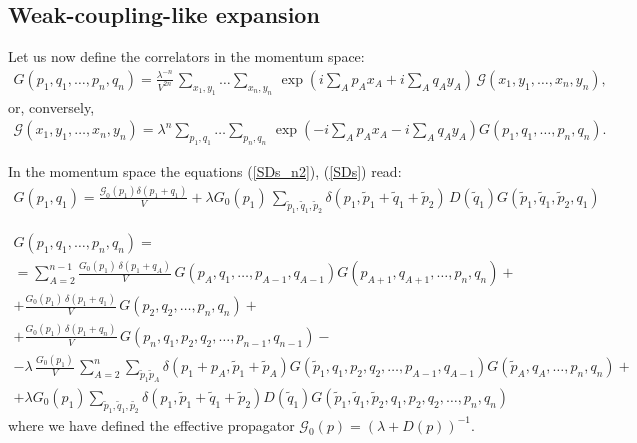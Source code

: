 \documentclass[12pt]{article}
\newcommand{\lr}[1]{ \left( #1 \right) }
\newcommand{\expa}[1]{ \exp{\left( #1 \right)} }
\newcommand{\G}{\mathcal{G}}
\begin{document}
\subsection*{Weak-coupling-like expansion}

Let us now define the correlators in the momentum space:
\begin{eqnarray}
\label{momentum_space_def}
 G\lr{p_1, q_1, \ldots, p_n, q_n} = \frac{\lambda^{-n}}{V^{2 n}} \,
\sum\limits_{x_1, y_1} \ldots \sum\limits_{x_n, y_n} \,
\expa{i \sum\limits_A p_A x_A + i \sum\limits_A q_A y_A} \,
\G\lr{x_1, y_1, \ldots, x_n, y_n}  ,
\end{eqnarray}
or, conversely,
\begin{eqnarray}
\label{momentum_space_def_inverse}
 \G\lr{x_1, y_1, \ldots, x_n, y_n}
 =
 \lambda^{n}
 \sum\limits_{p_1, q_1} \ldots \sum\limits_{p_n, q_n} \,
 \expa{-i \sum\limits_A p_A x_A - i \sum\limits_A q_A y_A}
  G\lr{p_1, q_1, \ldots, p_n, q_n} .
\end{eqnarray}

In the momentum space the equations (\ref{SDs_n2}), (\ref{SDs}) read:
\begin{eqnarray}
\label{SDs_n2_momentum}
 G\lr{p_1, q_1} = \frac{\G_0\lr{p_1} \delta\lr{p_1 + q_1}}{V}
 +
 \lambda G_0\lr{p_1} \,
\sum\limits_{\tilde{p}_1, \tilde{q}_1, \tilde{p}_2}
\delta\lr{p_1, \tilde{p}_1 + \tilde{q}_1 + \tilde{p}_2} \,
D\lr{\tilde{q}_1} G\lr{\tilde{p}_1, \tilde{q}_1, \tilde{p}_2, q_1}
\end{eqnarray}

\begin{eqnarray}
\label{SDs_pcm_momentum}
 G\lr{p_1, q_1, \ldots, p_n, q_n}
 = \nonumber \\ =
 \sum\limits_{A=2}^{n-1}
 \frac{G_0\lr{p_1} \, \delta\lr{p_1 + q_A}}{V} \,
 G\lr{    p_A,     q_1, \ldots, p_{A-1}, q_{A-1}}
 G\lr{p_{A+1}, q_{A+1}, \ldots,     p_n,    q_n }
 + \nonumber \\ +
 \frac{G_0\lr{p_1} \, \delta\lr{p_1 + q_1}}{V} \,
 G\lr{p_2, q_2, \ldots, p_n, q_n}
 + \nonumber \\ +
 \frac{G_0\lr{p_1} \, \delta\lr{p_1 + q_n}}{V} \,
 G\lr{p_n, q_1, p_2, q_2, \ldots, p_{n-1}, q_{n-1}}
 - \nonumber \\ -
 \lambda \, \frac{G_0\lr{p_1}}{V} \,
 \sum\limits_{A=2}^{n}
 \sum\limits_{\tilde{p}_1 \tilde{p}_A} \delta\lr{p_1 + p_A, \tilde{p}_1 + \tilde{p}_A}
 G\lr{\tilde{p}_1, q_1, p_2, q_2, \ldots, p_{A-1}, q_{A-1}}
 G\lr{\tilde{p}_A, q_A,           \ldots, p_n, q_n}
 + \nonumber \\ +
 \lambda G_0\lr{p_1}
 \sum\limits_{\tilde{p}_1, \tilde{q}_1, \tilde{p_2}}
 \delta\lr{p_1, \tilde{p}_1 + \tilde{q}_1 + \tilde{p}_2} D\lr{\tilde{q}_1}
 G\lr{\tilde{p}_1, \tilde{q}_1, \tilde{p}_2, q_1, p_2, q_2, \ldots, p_n, q_n}
\end{eqnarray}
where we have defined the effective propagator $\G_0\lr{p} = \lr{\lambda + D\lr{p}}^{-1}$.
\end{document}
